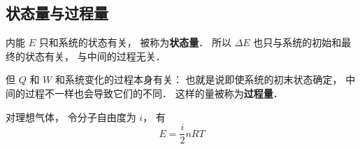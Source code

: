 \subsection{状态量与过程量}
内能 $E$ 只和系统的状态有关， 被称为\textbf{状态量}． 所以 $\Delta E$ 也只与系统的初始和最终的状态有关， 与中间的过程无关．

但 $Q$ 和 $W$ 和系统变化的过程本身有关： 也就是说即使系统的初末状态确定， 中间的过程不一样也会导致它们的不同． 这样的量被称为\textbf{过程量}．



对理想气体， 令分子自由度为 $i$， 有
\begin{equation}
E = \frac{i}{2}n RT
\end{equation}
